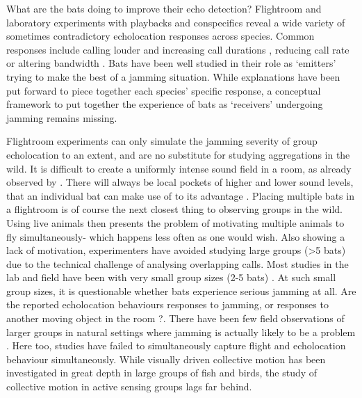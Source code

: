 \documentclass[
]{book}
\begin{document}
What are the bats doing to improve their echo detection? Flightroom and laboratory experiments with playbacks and conspecifics reveal a wide variety of sometimes contradictory echolocation responses across species. Common responses include calling louder and increasing call durations \citep{tressler2009a, m1989a, amichai2015a, luo2015linking}, reducing call rate \citep{adams2017a} or altering bandwidth \citep{hase2016a, hase2018a, hage2013ambient}. Bats have been well studied in their role as `emitters' trying to make the best of a jamming situation. While explanations have been put forward to piece together each species' specific response, a conceptual framework to put together the experience of bats as `receivers' undergoing jamming remains missing.

Flightroom experiments can only simulate the jamming severity of group echolocation to an extent, and are no substitute for studying aggregations in the wild. It is difficult to create a uniformly intense sound field in a room, as already observed by \citet{griffinresistance}. There will always be local pockets of higher and lower sound levels, that an individual bat can make use of to its advantage . Placing multiple bats in a flightroom is of course the next closest thing to observing groups in the wild. Using live animals then presents the problem of motivating multiple animals to fly simultaneously- which happens less often as one would wish. Also showing a lack of motivation, experimenters have avoided studying large groups (\textgreater5 bats) due to the technical challenge of analysing overlapping calls. Most studies in the lab and field have been with very small group sizes (2-5 bats) \citep{jones1994individual, fawcett2015clutter, fawcett2015echolocation, goetze2016a, adams2017a, hase2018a}. At such small group sizes, it is questionable whether bats experience serious jamming at all. Are the reported echolocation behaviours responses to jamming, or responses to another moving object in the room \citep{fawcett2015clutter, fawcett2015echolocation, cvikel2015a}?. There have been few field observations of larger groups in natural settings where jamming is actually likely to be a problem \citep{gillam2010a, theriault2010a, cvikel2015a, lin2016a}. Here too, studies have failed to simultaneously capture flight and echolocation behaviour simultaneously. While visually driven collective motion has been investigated in great depth in large groups of fish and birds, the study of collective motion in active sensing groups lags far behind.
\end{document}
